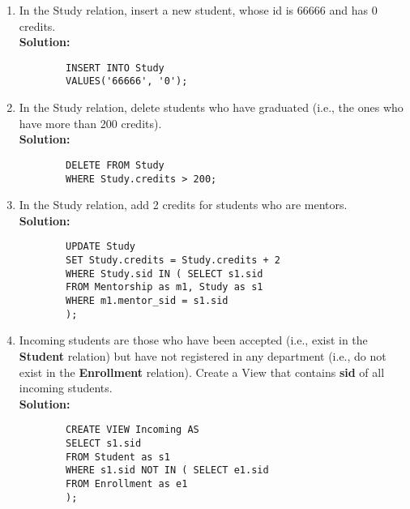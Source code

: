\documentclass[paper=a4, fontsize=11pt]{scrartcl}
\numberwithin{equation}{section}		%
\numberwithin{figure}{section}			%
\numberwithin{table}{section}				%
\begin{document}
	\begin{enumerate}
		\item In the Study relation, insert a new student, whose id is 66666 and has 0 credits.\\
		\textbf{Solution: }
		\begin{lstlisting}
		INSERT INTO Study
		VALUES('66666', '0');
		\end{lstlisting}
		
		\item In the Study relation, delete students who have graduated (i.e., the ones who have more than 200 credits).\\
		\textbf{Solution: }
		\begin{lstlisting}
		DELETE FROM Study
		WHERE Study.credits > 200;
		\end{lstlisting}
		
		\item In the Study relation, add 2 credits for students who are mentors.\\
		\textbf{Solution: }
		\begin{lstlisting}
		UPDATE Study
		SET Study.credits = Study.credits + 2
		WHERE Study.sid IN ( SELECT s1.sid
		FROM Mentorship as m1, Study as s1
		WHERE m1.mentor_sid = s1.sid
		);
		\end{lstlisting}
		
		\item Incoming students are those who have been accepted (i.e., exist in the \textbf{Student} relation) but have not registered in any department (i.e., do not exist in the \textbf{Enrollment} relation). Create a View that contains \textbf{sid} of all incoming students.\\
		\textbf{Solution: }
		\begin{lstlisting}
		CREATE VIEW Incoming AS
		SELECT s1.sid
		FROM Student as s1
		WHERE s1.sid NOT IN ( SELECT e1.sid
		FROM Enrollment as e1
		);
		\end{lstlisting}
		
	\end{enumerate}
	
	
	
\end{document}
